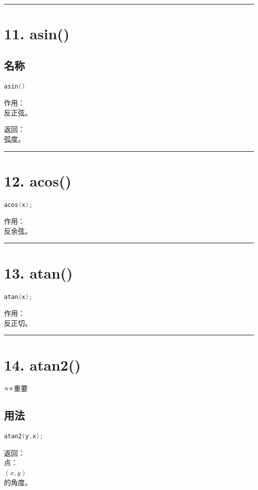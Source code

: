 \documentclass[9pt,twocolumn]{extarticle}
\begin{document}
\noindent\rule{\linewidth}{0.4pt}

\section{11. asin()}

\subsection{名称}
\begin{lstlisting}[language=C++]
asin()
\end{lstlisting}
作用：\\
反正弦。

返回：\\
弧度。

\noindent\rule{\linewidth}{0.4pt}

\section{12. acos()}
\begin{lstlisting}[language=C++]
acos(x);
\end{lstlisting}
作用：\\
反余弦。

\noindent\rule{\linewidth}{0.4pt}

\section{13. atan()}
\begin{lstlisting}[language=C++]
atan(x);
\end{lstlisting}
作用：\\
反正切。

\noindent\rule{\linewidth}{0.4pt}

\section{14. atan2()}

⭐⭐重要

\subsection{用法}
\begin{lstlisting}[language=C++]
atan2(y,x);
\end{lstlisting}
返回：\\
点：\\
$(x,y)$\\
的角度。
\end{document}
